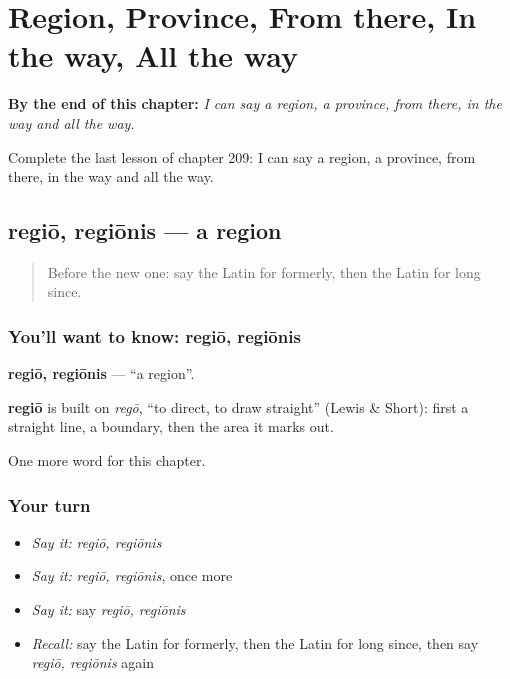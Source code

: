
\chapter{Region, Province, From there, In the way, All the way}
\label{ch:la-region-province-from-there-in-the-way-all-the-way}

\begin{chapteropening}
\textbf{By the end of this chapter:} \emph{I can say a region, a province, from there, in the way and all the way.}

Complete the last lesson of chapter 209: I can say a region, a province, from there, in the way and all the way.
\end{chapteropening}

\section[regiō, regiōnis]{regiō, regiōnis — a region}

\label{lesson:LA-C209-regio}



\begin{quote}
Before the new one: say the Latin for formerly, then the Latin for long since.
\end{quote}

\subsection*{You'll want to know: regiō, regiōnis}
\textbf{regiō, regiōnis} — \textquotedblleft{}a region\textquotedblright{}.

\begin{cousinweb}
\textbf{regiō} is built on \emph{regō}, \textquotedblleft{}to direct, to draw straight\textquotedblright{} (Lewis \& Short): first a straight line, a boundary, then the area it marks out.
\end{cousinweb}

\begin{grammarlens}[title={What you've built}]
One more word for this chapter.
\end{grammarlens}

\subsection*{Your turn}
\begin{itemize}
\raggedright
  \item \emph{Say it:} \emph{regiō, regiōnis}
  \item \emph{Say it:} \emph{regiō, regiōnis}, once more
  \item \emph{Say it:} say \emph{regiō, regiōnis}
  \item \emph{Recall:} say the Latin for formerly, then the Latin for long since, then say \emph{regiō, regiōnis} again
\end{itemize}

